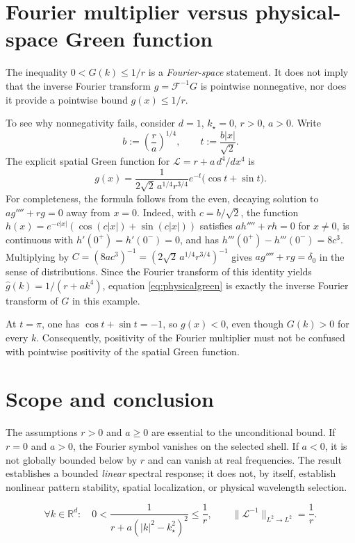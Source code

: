 \documentclass[11pt]{article}
\newcommand{\R}{\mathbb R}
\newcommand{\F}{\mathcal F}
\newcommand{\norm}[1]{\lVert #1\rVert}
\begin{document}
\section{Fourier multiplier versus physical-space Green function}

The inequality $0<G(k)\leq1/r$ is a \emph{Fourier-space}
statement. It does not imply that the inverse Fourier transform
$g=\F^{-1}G$ is pointwise nonnegative, nor does it provide a
pointwise bound $g(x)\leq1/r$.

To see why nonnegativity fails, consider $d=1$, $k_\star=0$,
$r>0$, $a>0$. Write
\begin{equation}
  b:=\left(\frac ra\right)^{1/4},
  \qquad t:=\frac{b|x|}{\sqrt2}.
\end{equation}
The explicit spatial Green function for
$\mathcal L=r+a\,d^4/dx^4$ is
\begin{equation}\label{eq:physicalgreen}
  g(x)=\frac{1}{2\sqrt2\,a^{1/4}r^{3/4}}
       e^{-t}\bigl(\cos t+\sin t\bigr).
\end{equation}
For completeness, the formula follows from the even, decaying
solution to $ag''''+rg=0$ away from $x=0$. Indeed, with
$c=b/\sqrt2$, the function
$h(x)=e^{-c|x|}(\cos(c|x|)+\sin(c|x|))$
satisfies $ah''''+rh=0$ for $x\ne0$, is continuous with
$h'(0^+)=h'(0^-)=0$, and has
$h'''(0^+)-h'''(0^-)=8c^3$. Multiplying by
$C=(8ac^3)^{-1}=(2\sqrt2\,a^{1/4}r^{3/4})^{-1}$ gives
$ag''''+rg=\delta_0$ in the sense of distributions.
Since the Fourier transform of this identity yields
$\widehat g(k)=1/(r+ak^4)$, equation
\eqref{eq:physicalgreen} is exactly the inverse Fourier transform
of $G$ in this example.

At $t=\pi$, one has
$\cos t+\sin t=-1$, so $g(x)<0$, even though
$G(k)>0$ for every $k$. Consequently, positivity of the
Fourier multiplier must not be confused with pointwise positivity
of the spatial Green function.

\section{Scope and conclusion}

The assumptions $r>0$ and $a\geq0$ are essential to the
unconditional bound. If $r=0$ and $a>0$, the Fourier symbol
vanishes on the selected shell. If $a<0$, it is not globally
bounded below by $r$ and can vanish at real frequencies. The
result establishes a bounded \emph{linear} spectral response;
it does not, by itself, establish nonlinear pattern stability,
spatial localization, or physical wavelength selection.

\begin{equation*}
  \boxed{
    \forall k\in\R^d:\quad
    0<\frac{1}{r+a(|k|^2-k_\star^2)^2}\leq\frac1r,
    \qquad
    \norm{\mathcal L^{-1}}_{L^2\to L^2}=\frac1r.
  }
\end{equation*}
\end{document}
